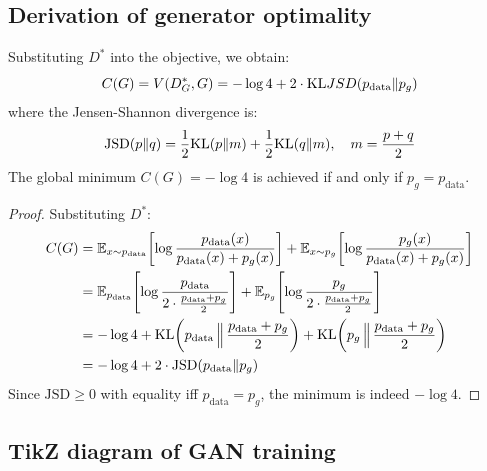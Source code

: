 \subsection{Derivation of generator optimality}

\begin{theorem}
\label{thm:optimal-G}
Substituting $D^*$ into the objective, we obtain:
\begin{equation}
C(G) = V(D^*_G, G) = -\log 4 + 2 \cdot \mathrm{KL}{JSD}(p_{\text{data}} \| p_g)
\end{equation}
where the Jensen-Shannon divergence is:
\begin{equation}
\text{JSD}(p \| q) = \frac{1}{2}\mathrm{KL}(p \| m) + \frac{1}{2}\mathrm{KL}(q \| m), \quad m = \frac{p + q}{2}
\end{equation}
The global minimum $C(G) = -\log 4$ is achieved if and only if $p_g = p_{\text{data}}$.
\end{theorem}

\begin{proof}
Substituting $D^*$:
\begin{align}
C(G) &= \mathbb{E}_{x \sim p_{\text{data}}}\!\left[\log \frac{p_{\text{data}}(x)}{p_{\text{data}}(x) + p_g(x)}\right] + \mathbb{E}_{x \sim p_g}\!\left[\log \frac{p_g(x)}{p_{\text{data}}(x) + p_g(x)}\right] \\
&= \mathbb{E}_{p_{\text{data}}}\!\left[\log \frac{p_{\text{data}}}{2 \cdot \frac{p_{\text{data}} + p_g}{2}}\right] + \mathbb{E}_{p_g}\!\left[\log \frac{p_g}{2 \cdot \frac{p_{\text{data}} + p_g}{2}}\right] \\
&= -\log 4 + \mathrm{KL}\!\left(p_{\text{data}} \,\Big\|\, \frac{p_{\text{data}} + p_g}{2}\right) + \mathrm{KL}\!\left(p_g \,\Big\|\, \frac{p_{\text{data}} + p_g}{2}\right) \\
&= -\log 4 + 2 \cdot \text{JSD}(p_{\text{data}} \| p_g)
\end{align}
Since $\text{JSD} \geq 0$ with equality iff $p_{\text{data}} = p_g$, the minimum is indeed $-\log 4$.
\end{proof}

\subsection{TikZ diagram of GAN training}

